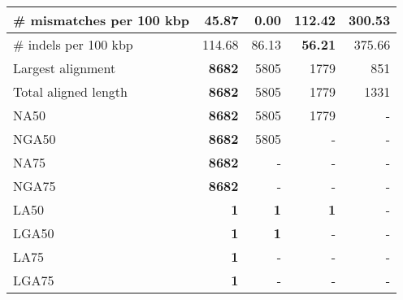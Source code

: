 \documentclass[12pt,a4paper]{article}
\begin{document}
\begin{table}[ht]
\begin{center}
\begin{tabular}{|l*{4}{|r}|}
\# mismatches per 100 kbp & 45.87 & {\bf 0.00} & 112.42 & 300.53 \\ \hline
\# indels per 100 kbp & 114.68 & 86.13 & {\bf 56.21} & 375.66 \\ \hline
Largest alignment & {\bf 8682} & 5805 & 1779 & 851 \\ \hline
Total aligned length & {\bf 8682} & 5805 & 1779 & 1331 \\ \hline
NA50 & {\bf 8682} & 5805 & 1779 & - \\ \hline
NGA50 & {\bf 8682} & 5805 & - & - \\ \hline
NA75 & {\bf 8682} & - & - & - \\ \hline
NGA75 & {\bf 8682} & - & - & - \\ \hline
LA50 & {\bf 1} & {\bf 1} & {\bf 1} & - \\ \hline
LGA50 & {\bf 1} & {\bf 1} & - & - \\ \hline
LA75 & {\bf 1} & - & - & - \\ \hline
LGA75 & {\bf 1} & - & - & - \\ \hline
\end{tabular}
\end{center}
\end{table}
\end{document}
